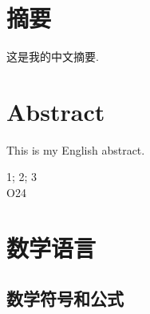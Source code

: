 \documentclass[a4paper,punct=banjiao,twoside]{ctexrep}
\theoremstyle{plain}
\theoremstyle{definition}
\theoremstyle{remark}
\begin{document}
\renewcommand{\contentsname}{目\quad 录}
\tableofcontents
\setcounter{page}{1}

\chapter*{摘\quad 要}
\normalsize

这是我的中文摘要.

\chapter*{Abstract}
\normalsize

This is my English abstract.

 1; 2; 3\\
 O24

\clearpage
\mbox{}
\thispagestyle{empty}

\renewcommand{\thepage}{\arabic{page}}
\setcounter{page}{0}

\chapter{数学语言}

\section{数学符号和公式}
\end{document}
